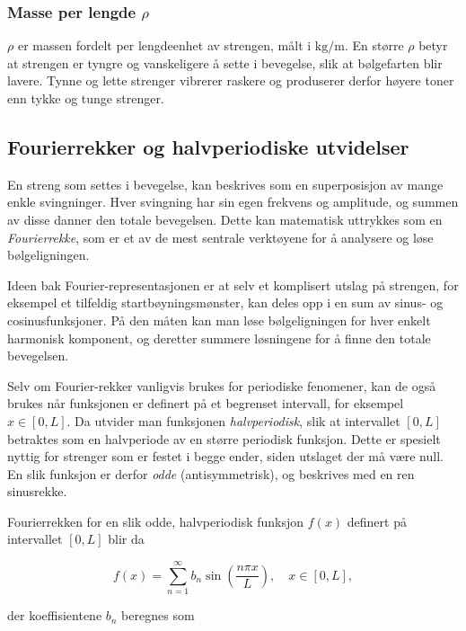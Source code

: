 \subsubsection{Masse per lengde \texorpdfstring{$\rho$}{rho}}
$\rho$ er massen fordelt per lengdeenhet av strengen, målt i $\text{kg/m}$. 
En større $\rho$ betyr at strengen er tyngre og vanskeligere å sette i bevegelse, slik at bølgefarten blir lavere. 
Tynne og lette strenger vibrerer raskere og produserer derfor høyere toner enn tykke og tunge strenger.

\subsection{Fourierrekker og halvperiodiske utvidelser}

En streng som settes i bevegelse, kan beskrives som en superposisjon av mange enkle svingninger.  
Hver svingning har sin egen frekvens og amplitude, og summen av disse danner den totale bevegelsen.  
Dette kan matematisk uttrykkes som en \textit{Fourierrekke}, som er et av de mest sentrale verktøyene for å analysere og løse bølgeligningen.  

Ideen bak Fourier-representasjonen er at selv et komplisert utslag på strengen, for eksempel et tilfeldig startbøyningsmønster, kan deles opp i en sum av sinus- og cosinusfunksjoner.  
På den måten kan man løse bølgeligningen for hver enkelt harmonisk komponent, og deretter summere løsningene for å finne den totale bevegelsen.  

Selv om Fourier-rekker vanligvis brukes for periodiske fenomener, kan de også brukes når funksjonen er definert på et begrenset intervall, for eksempel $x \in [0,L]$.  
Da utvider man funksjonen \textit{halvperiodisk}, slik at intervallet $[0,L]$ betraktes som en halvperiode av en større periodisk funksjon.  
Dette er spesielt nyttig for strenger som er festet i begge ender, siden utslaget der må være null.  
En slik funksjon er derfor \textit{odde} (antisymmetrisk), og beskrives med en ren sinusrekke. \parencite{intmathHalfRange}

Fourierrekken for en slik odde, halvperiodisk funksjon $f(x)$ definert på intervallet $[0,L]$ blir da

\begin{equation*}
f(x) = \sum_{n=1}^{\infty} b_n \sin\left(\frac{n\pi x}{L}\right), \quad x \in [0,L],
\end{equation*}

der koeffisientene $b_n$ beregnes som


